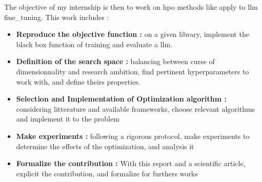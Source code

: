 The objective of my internship is then to work on \acrshort{hpo} methods like apply to \acrshort{llm} \gls{fine_tuning}. This work includes : 
\begin{itemize}
    \item \textbf{Reproduce the objective function :} on a given library, implement the black box function of training and evaluate a \acrshort{llm}.
    \item \textbf{Definition of the search space : }balancing between curse of dimensionnality and research ambition, find pertinent \glspl{hyperparameter} to work with, and define theirs properties.
    \item \textbf{Selection and Implementation of Optimization algorithm :} considering litterature and available frameworks, choose relevant algorithms and implement it to the problem
    \item \textbf{Make experiments :} following a rigorous protocol, make experiments to determine the effects of the optimization, and analysis it
    \item \textbf{Formalize the contribution :} With this report and a scientific article, explicit the contribution, and formalize for furthers works
\end{itemize}


